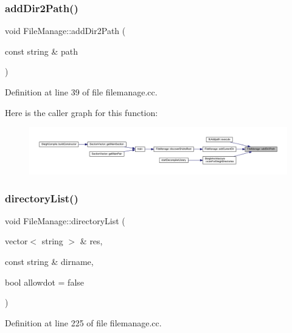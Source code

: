 \subsubsection{\texorpdfstring{addDir2Path()}{addDir2Path()}}
{\footnotesize\ttfamily void File\+Manage\+::add\+Dir2\+Path (\begin{DoxyParamCaption}\item[{const string \&}]{path }\end{DoxyParamCaption})}



Definition at line 39 of file filemanage.\+cc.

Here is the caller graph for this function\+:
\nopagebreak
\begin{figure}[H]
\begin{center}
\leavevmode
\includegraphics[width=350pt]{class_file_manage_a326d24da789cd3adde140bd1c5e5b7e6_icgraph}
\end{center}
\end{figure}
\mbox{\label{class_file_manage_a3394b908aa55d5f59d05cfafac789259}} 
\subsubsection{\texorpdfstring{directoryList()}{directoryList()}}
{\footnotesize\ttfamily void File\+Manage\+::directory\+List (\begin{DoxyParamCaption}\item[{vector$<$ string $>$ \&}]{res,  }\item[{const string \&}]{dirname,  }\item[{bool}]{allowdot = {\ttfamily false} }\end{DoxyParamCaption})\hspace{0.3cm}{\ttfamily [static]}}



Definition at line 225 of file filemanage.\+cc.

